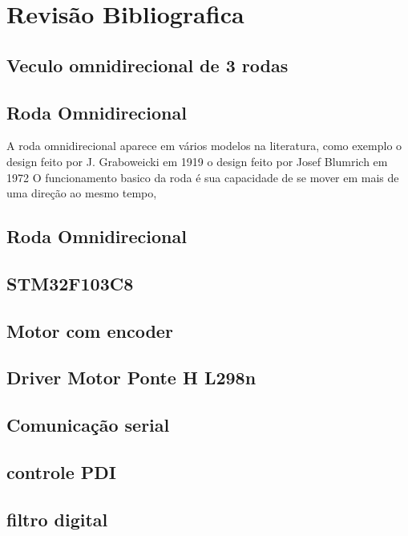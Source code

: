 
\chapter{Revisão Bibliografica}

\section{Veculo omnidirecional de 3 rodas}

\section{Roda Omnidirecional}

A roda omnidirecional aparece em vários modelos na literatura, como exemplo o design feito por J. Graboweicki em 1919 \cite{patent_US1305535A}
o design feito por Josef Blumrich em 1972 \cite{patent_US3789947A}
O funcionamento basico da roda é sua capacidade de se mover em mais de uma direção ao mesmo tempo, 


\section{Roda Omnidirecional}





\section{STM32F103C8}


\section{Motor com encoder}


\section{Driver Motor Ponte H L298n}


\section{Comunicação serial}


\section{controle PDI}


\section{filtro digital}




